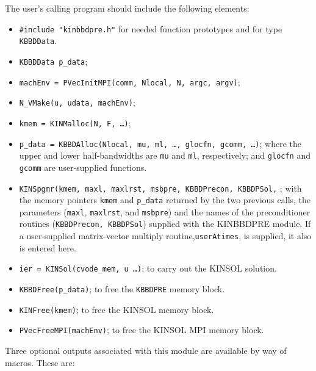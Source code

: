 The user's calling program should include the following elements:

\begin{itemize}
\item  {\tt \#include "kinbbdpre.h"} for needed function prototypes and for
type {\tt KBBDData}.

\item  {\tt KBBDData p\_data};

\item  {\tt machEnv = PVecInitMPI(comm, Nlocal, N, argc, argv)};

\item  {\tt N\_VMake(u, udata, machEnv)};

\item  {\tt kmem = KINMalloc(N, F, \ldots )};

\item  {\tt p\_data = KBBDAlloc(Nlocal, mu, ml, \ldots, glocfn, gcomm, \ldots)};
where the 
\newline upper and lower half-bandwidths are {\tt mu} and {\tt ml},
respectively; and {\tt glocfn} and {\tt gcomm} are user-supplied
functions.

\item  {\tt KINSpgmr(kmem, maxl, maxlrst, msbpre, KBBDPrecon, KBBDPSol,}
; with the memory pointers 
{\tt kmem} and {\tt p\_data} returned by the two previous calls,
the parameters ({\tt maxl}, {\tt maxlrst}, and {\tt msbpre}) and the
names of the preconditioner routines ({\tt KBBDPrecon, KBBDPSol})
supplied with the KINBBDPRE module. If a user-supplied matrix-vector multiply
routine,{\tt userAtimes}, is supplied, it also is entered here.

\item  {\tt ier = KINSol(cvode\_mem, u \ldots )}; to carry out the
KINSOL solution.

\item  {\tt KBBDFree(p\_data)}; to free the {\tt KBBDPRE} memory block.

\item  {\tt KINFree(kmem)}; to free the KINSOL memory block.

\item  {\tt PVecFreeMPI(machEnv)}; to free the KINSOL MPI memory block.
\end{itemize}

Three optional outputs associated with this module are available by way of
macros. These are:

